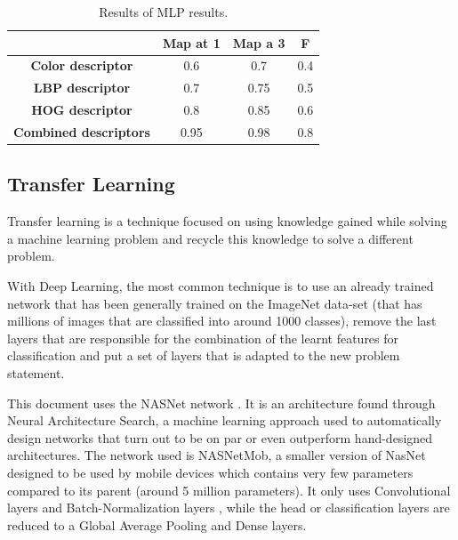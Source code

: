 \documentclass[runningheads]{llncs}
\begin{document}
\begin{table}[ht!] \label{MLPResults}
\caption{Results of MLP results.}
\begin{center}
\begin{tabular}{ | c | c | c | c | }
\hline
 & \textbf{Map at 1} & \textbf{Map a 3} & \textbf{F} \\ 
 \hline
 \textbf{Color descriptor} & 0.6 & 0.7 & 0.4 \\  
 \hline
 \textbf{LBP descriptor} & 0.7 & 0.75 & 0.5 \\ 
 \hline
 \textbf{HOG descriptor} & 0.8 & 0.85 & 0.6 \\  
 \hline
 \textbf{Combined descriptors} & 0.95 & 0.98 & 0.8 \\  
 \hline
\end{tabular}
\label{sample table}
\end{center}
\end{table}


\subsection{Transfer Learning} \label{transfer}

Transfer learning is a technique focused on using knowledge gained while solving a machine learning problem and recycle this knowledge to solve a different problem.

With Deep Learning, the most common technique is to use an already trained network that has been generally trained on the ImageNet data-set \cite{imagenet_cvpr09} (that has millions of images that are classified into around 1000 classes), remove the last layers that are responsible for the combination of the learnt features for classification and put a set of layers that is adapted to the new problem statement.


This document uses the NASNet network \cite{DBLP:journals/corr/ZophVSL17}. It is an architecture found through Neural Architecture Search, a machine learning approach used to automatically design networks that turn out to be on par or even outperform hand-designed architectures.
The network used is NASNetMob, a smaller version of NasNet designed to be used by mobile devices which contains very few parameters compared to its parent (around 5 million parameters). It only uses Convolutional layers \cite{0483bd9444a348c8b59d54a190839ec9} and Batch-Normalization layers \cite{10.5555/3045118.3045167}, while the head or classification layers are reduced to a Global Average Pooling and Dense layers.
\end{document}

